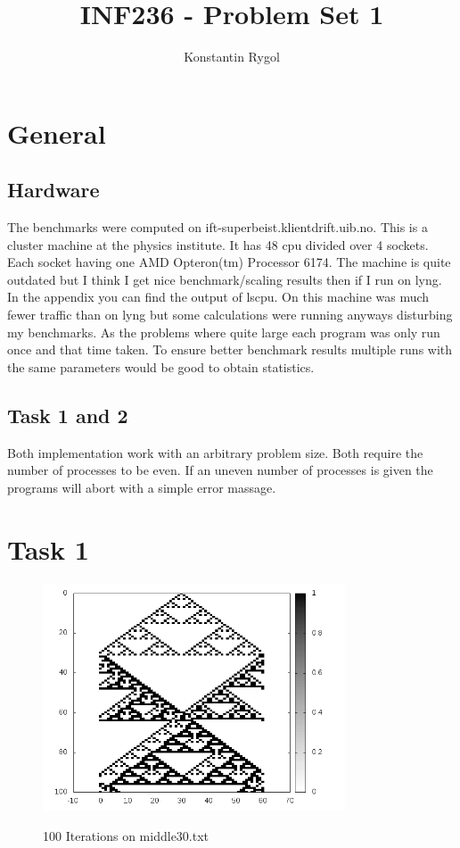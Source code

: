 \documentclass[11pt]{article} %
\title{INF236 - Problem Set 1}
\author{Konstantin Rygol}
\begin{document}
\maketitle

\section{General}
\subsection{Hardware}
The benchmarks were computed on ift-superbeist.klientdrift.uib.no. This is a cluster machine at the
physics institute. 
It has 48 cpu divided over 4 sockets. Each socket having one AMD Opteron(tm) Processor 6174. The
machine is quite outdated but I think I get nice benchmark/scaling results then if I run on lyng.
In the appendix you can find the output of lscpu. On this machine was much fewer traffic than on
lyng but some calculations were running anyways disturbing my benchmarks.
As the problems where quite large each program was only run once and that time taken. To ensure
better benchmark results multiple runs with the same parameters would be good to obtain statistics.

\subsection{Task 1 and 2}
Both implementation work with an arbitrary problem size. Both require the number of processes to be
even. If an uneven number of processes is given the programs will abort with a simple 
error massage.    

\section{Task 1}
\begin{figure}[ht]
 \centering
\includegraphics[width=0.8\textwidth]{graphics/Task1.png} \\
 \caption[]{100 Iterations on middle30.txt}
\end{figure}
\end{document}
